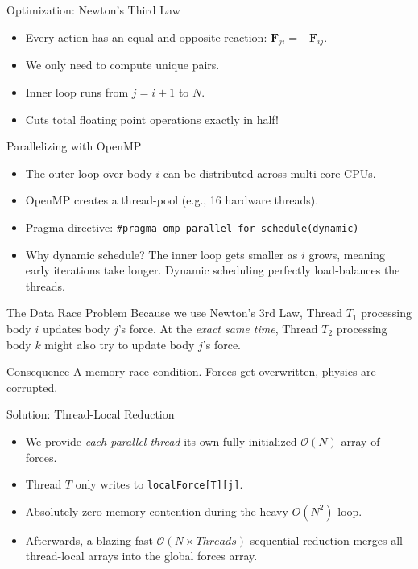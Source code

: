 \documentclass[aspectratio=169]{beamer}
\begin{document}
\begin{frame}{Optimization: Newton's Third Law}
    \begin{itemize}
        \item Every action has an equal and opposite reaction: $\mathbf{F}_{ji} = -\mathbf{F}_{ij}$.
        \item We only need to compute unique pairs.
        \item Inner loop runs from $j = i + 1$ to $N$.
        \item Cuts total floating point operations exactly in half!
    \end{itemize}
\end{frame}

\begin{frame}{Parallelizing with OpenMP}
    \begin{itemize}
        \item The outer loop over body $i$ can be distributed across multi-core CPUs.
        \item OpenMP creates a thread-pool (e.g., 16 hardware threads).
        \item Pragma directive: \texttt{\#pragma omp parallel for schedule(dynamic)}
        \item Why dynamic schedule? The inner loop gets smaller as $i$ grows, meaning early iterations take longer. Dynamic scheduling perfectly load-balances the threads.
    \end{itemize}
\end{frame}

\begin{frame}[fragile]{The Data Race Problem}
    Because we use Newton's 3rd Law, Thread $T_1$ processing body $i$ updates body $j$'s force.
    At the \textit{exact same time}, Thread $T_2$ processing body $k$ might also try to update body $j$'s force.
    
    \begin{block}{Consequence}
        A memory race condition. Forces get overwritten, physics are corrupted.
    \end{block}
\end{frame}

\begin{frame}{Solution: Thread-Local Reduction}
    \begin{itemize}
        \item We provide \textit{each parallel thread} its own fully initialized $\mathcal{O}(N)$ array of forces.
        \item Thread $T$ only writes to \texttt{localForce[T][j]}.
        \item Absolutely zero memory contention during the heavy $O(N^2)$ loop.
        \item Afterwards, a blazing-fast $\mathcal{O}(N \times Threads)$ sequential reduction merges all thread-local arrays into the global forces array.
    \end{itemize}
\end{frame}
\end{document}
